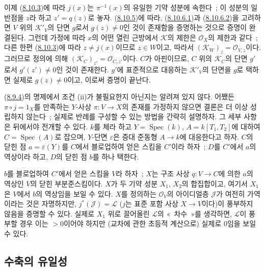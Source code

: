 \begin{env}[8.10.6]
이제 (\hyperref[II.8.10.3-ko]{8.10.3})에 따라 $j(x)$는
$\pi^{-1}(x)$의 유일한 기약 성분에 속한다~; 이 성분의 일반점을 $z$라
하고 $z'=q(z)$로 놓자. (\hyperref[II.8.10.5-ko]{8.10.5})에 따라,
(\hyperref[II.8.10.6.1-ko]{8.10.6.1})과
(\hyperref[II.8.10.6.2-ko]{8.10.6.2})을 고려하면 $V$ 위의
$\mathcal{K}'_V$의 단면 $g$로서 $g(z)\neq0$인 것이 존재함을 증명하는
것으로 증명이 완결된다. 그런데 가정에 따라 $x$의 어떤 열린 근방에서
$\mathcal{K}$의 제한은 $\mathcal{O}_X$의 제한과 같다~; 다른 한편
(\hyperref[II.8.10.3-ko]{8.10.3})에 따라 $z\neq j(x)$이므로 $z\in W$이고,
따라서 $(\mathcal{K}_W)_z=\mathcal{O}_{V,z}$이다. 그러므로 정의에 의해
$(\mathcal{K}_C)_{z'}=\mathcal{O}_{C,z'}$이다. $C$가 아핀이므로,
$C$ 위의 $\mathcal{K}_C$의 단면 $g'$로서 $g'(z')\neq0$인 것이 존재한다.
$g'$에 표준적으로 대응하는 $\mathcal{K}'_V$의 단면을 $g$로 택하면 실제로
$g(z)\neq0$이고, 이로써 증명이 끝난다.
\end{env}

\begin{remark}[8.10.7]
\label{II.8.10.7-ko}
(\hyperref[II.8.9.4-ko]{8.9.4})의 명제에서 조건 (ii)가 불필요한지
아닌지는 알려져 있지 않다. 어쨌든 $\pi\circ j=1_X$를 만족하는
$Y$-사상 $\pi:V\to X$의 존재를 가정하지 않으면 결론은 더 이상
성립하지 않는다~; 실제로 반례를 구성할 수 있는 방법을 간략히 설명하자.
그 세부 사항은 뒤에서야 전개할 수 있다. $k$를 체라 하고
$Y=\operatorname{Spec}(k)$, $A=k[T_1,T_2]$에 대하여
$C=\operatorname{Spec}(A)$로 잡으며, $Y$-단면 $\varepsilon$은 증대
준동형 $A\to k$에 대응한다고 하자. $C$의 닫힌 점
$a=\varepsilon(Y)$를 $C$에서 블로업하여 얻은 스킴을 $C'$이라 하자~; $D$를
$C'$에서 $a$의 역상이라 하고, $D$의 닫힌 점 $b$를 하나 택한다.

$b$를 블로업하여 $C'$에서 얻은 스킴을 $V$라 하자~; $X$는 구조 사상
$q:V\to C$에 의한 $a$의 역상인 $V$의 닫힌 부분준스킴이다. $X$가 두
기약 성분 $X_1$, $X_2$의 합집합이고, 여기서 $X_1$은 $V$에서 $b$의
역상임을 보일 수 있다. $X$를 정의하는 $\mathcal{O}_V$의 아이디얼층
$\mathcal{J}$가 여전히 가역이라는 것은 자명하지만,
$j^*(\mathcal{J})=\mathcal{L}$ ($j$는 표준 포함 사상 $X\to V$이다)이
풍부하지 않음을 증명할 수 있다. 실제로 $X_1$ 위로 끌어올린
$\mathcal{L}$의 «~차수~»를 생각하면, $\mathcal{L}$이 풍부할 경우 이는
$>0$이어야 하지만 (교차에 관한 초등적 계산으로) 실제로 0임을 보일 수
있다.
\end{remark}

\subsection{수축의 유일성}
\label{subsection:II.8.11-ko}

